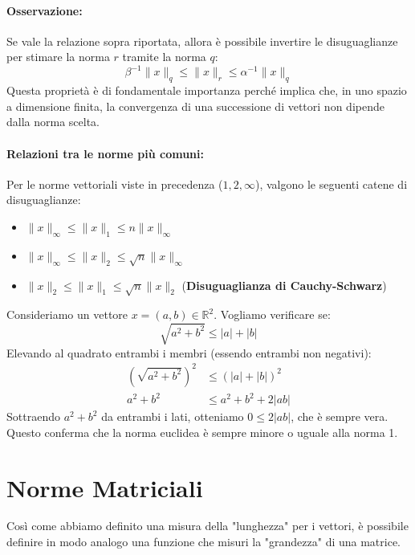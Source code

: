 \documentclass[a4paper,12pt]{article}
\begin{document}
	\paragraph{Osservazione:}
	Se vale la relazione sopra riportata, allora è possibile invertire le disuguaglianze per stimare la norma $r$ tramite la norma $q$:
	\[
	\beta^{-1} \|x\|_q \le \|x\|_r \le \alpha^{-1} \|x\|_q
	\]
	Questa proprietà è di fondamentale importanza perché implica che, in uno spazio a dimensione finita, la convergenza di una successione di vettori non dipende dalla norma scelta.
	
	\paragraph{Relazioni tra le norme più comuni:}
	Per le norme vettoriali viste in precedenza ($1, 2, \infty$), valgono le seguenti catene di disuguaglianze:
	
	\begin{itemize}
		\item $\|x\|_\infty \le \|x\|_1 \le n \|x\|_\infty$
		\item $\|x\|_\infty \le \|x\|_2 \le \sqrt{n} \|x\|_\infty$
		\item $\|x\|_2 \le \|x\|_1 \le \sqrt{n} \|x\|_2$ \quad (\textbf{Disuguaglianza di Cauchy-Schwarz})
	\end{itemize}
	
	\begin{tcolorbox}[title=Esempio di verifica: $\|x\|_2 \le \|x\|_1$ in $\mathbb{R}^2$, colback=white]
		Consideriamo un vettore $x = (a, b) \in \mathbb{R}^2$. Vogliamo verificare se:
		\[ \sqrt{a^2 + b^2} \le |a| + |b| \]
		Elevando al quadrato entrambi i membri (essendo entrambi non negativi):
		\begin{align*}
			(\sqrt{a^2 + b^2})^2 &\le (|a| + |b|)^2 \\
			a^2 + b^2 &\le a^2 + b^2 + 2|ab|
		\end{align*}
		Sottraendo $a^2 + b^2$ da entrambi i lati, otteniamo $0 \le 2|ab|$, che è sempre vera. Questo conferma che la norma euclidea è sempre minore o uguale alla norma 1.
	\end{tcolorbox}
	\section{Norme Matriciali}
	
	Così come abbiamo definito una misura della "lunghezza" per i vettori, è possibile definire in modo analogo una funzione che misuri la "grandezza" di una matrice.
	
\end{document}
